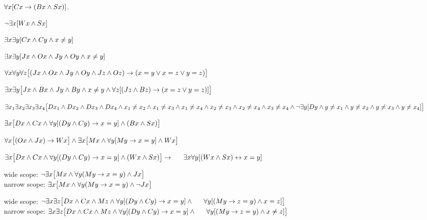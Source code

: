 \documentclass[PHIL101-Textbook.tex]{subfiles}
\begin{document}
%	
	\begin{earg}
	\item %
	$\forall x[Cx \rightarrow (Bx \land Sx)]$.
	\item %
	$\neg\exists x [Wx \land Sx]$
	\item %
	$\exists x \exists y[Cx \land Cy \land x\neq y]$
	\item %
	$\exists x \exists y[Jx \land Ox \land Jy \land Oy \land x\neq y]$
	\item %
	$\forall x\forall y\forall z\bigl[(Jx \land Ox \land Jy \land Oy \land Jz \land Oz)\rightarrow(x=y \vee x=z \vee y=z)\bigr]$
	\item %
	$\exists x\exists y\bigl[Jx \land Bx \land Jy \land By \land x \neq y\land \forall z[(Jz \land Bz) \rightarrow (x=z \vee y=z)]\bigr]$
	\item %
	$\exists x_1\exists x_2\exists x_3\exists x_4\bigl[Dx_1 \land Dx_2 \land Dx_3 \land Dx_4 \land x_1 \neq x_2 \land x_1 \neq x_3 \land x_1 \neq x_4 \land x_2 \neq x_3 \land x_2 \neq x_4 \land x_3 \neq x_4  \land \neg\exists y[Dy \land y\neq x_1 \land y\neq x_2 \land y\neq x_3 \land y\neq x_4]\bigr]$
	\item %
	$\exists x\bigl[Dx \land Cx \land \forall y[(Dy\land Cy) \rightarrow x=y] \land (Bx \land Sx)\bigr]$
	\item %
	$\forall x\bigl[(Ox \land Jx) \rightarrow Wx\bigr] \land \exists x\bigl[Mx \land \forall y[My \rightarrow x=y] \land Wx\bigr]$
	\item %
	$\exists x\bigl[Dx \eand Cx \eand \forall y[(Dy\eand Cy) \eif x=y] \eand (Wx \eand Sx)\bigr]\eif \\ 
	\indent \exists x\forall y[(Wx \eand Sx) \eiff x=y]$
	\item %
	wide scope: $\neg \exists x\bigl[Mx \land \forall y(My \rightarrow x=y) \land Jx\bigr]$\\
	narrow scope: $\exists x\bigl[Mx \land \forall y(My \rightarrow x=y) \land \neg Jx\bigr]$
	\item %
	wide scope: $\enot \exists x\exists z\bigl[Dx \eand Cx \eand Mz \eand \forall y[(Dy\eand Cy) \eif x=y]  \eand \\
	 \indent \forall y[(My \eif z=y) \eand x=z]\bigr]$\\
	narrow scope: $\exists x\exists z\bigl[Dx \eand Cx \eand Mz \eand \forall y[(Dy\eand Cy) \eif x=y]  \eand \\
	 \indent\forall y[(My \eif z=y) \eand x\neq z]\bigr]$
	\end{earg}
\end{document}
